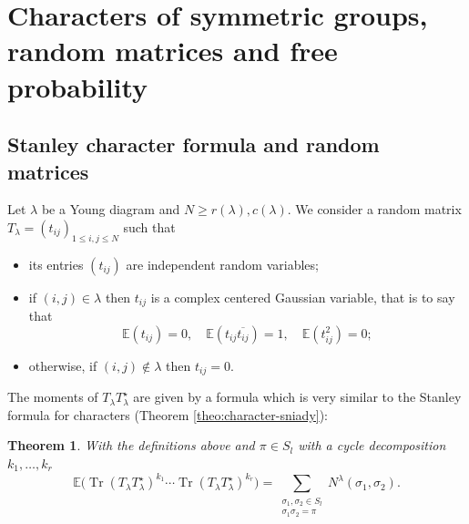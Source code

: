 \documentclass[12pt]{amsart}
\theoremstyle{plain}
\newtheorem{theorem}[lemma]{Theorem}
\theoremstyle{remark}
\newcommand{\E}{\mathbb{E}}
\DeclareMathOperator{\Tr}{Tr}
\begin{document}
\section{Characters of symmetric groups, random matrices and free probability}
\label{sec:random-matrices}

\subsection{Stanley character formula and random matrices}
Let $\lambda$ be a  Young diagram and $N\geq r(\lambda),c(\lambda)$. We consider a random matrix
$T_\lambda=(t_{ij})_{1\leq i,j\leq N}$ such that
\begin{itemize}
\item its entries $(t_{ij})$ are independent random variables;
\item if $(i,j) \in \lambda$ then $t_{ij}$ is a complex centered Gaussian
variable, that is to say that
$$
\E(t_{ij}) =0, \quad 
\E(t_{ij} \overline{t_{ij}}) = 1, \quad
\E(t_{ij}^2) =0; 
$$
\item otherwise, if $(i,j) \notin \lambda$ then $t_{ij}=0$.
\end{itemize}
The moments of $T_\lambda
T_\lambda^\star$ are given by a formula which is very similar to 
the Stanley formula for characters (Theorem
\ref{theo:character-sniady}):
\begin{theorem}
\label{theo:random-matrices}
With the definitions above and $\pi \in S_l$ with a cycle decomposition 
$k_1,\ldots,k_r$
\begin{equation}
\label{eq:moments-matrix}
\E\big(\Tr(T_\lambda T_\lambda^\star)^{k_1} \cdots \Tr(T_\lambda
T_\lambda^\star)^{k_r} \big)=\sum_{\substack{\sigma_1,\sigma_2 \in S_l \\
\sigma_1 \sigma_2=\pi}} N^\lambda(\sigma_1,\sigma_2).
\end{equation}
\end{theorem}
\end{document}
